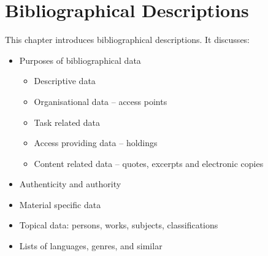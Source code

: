 
\chapter{Bibliographical Descriptions}
\label{cha:bibl}

This chapter introduces bibliographical descriptions. It discusses:
\begin{itemize}
\item Purposes of bibliographical data
  \begin{itemize}
  \item Descriptive data 
  \item Organisational data -- access points
  \item Task related data 
  \item Access providing data -- holdings  
  \item Content related data -- quotes, excerpts and electronic copies
  \end{itemize}
\item Authenticity and authority
\item Material specific data
\item Topical data: persons, works, subjects, classifications
\item Lists of languages, genres, and similar
\end{itemize}
